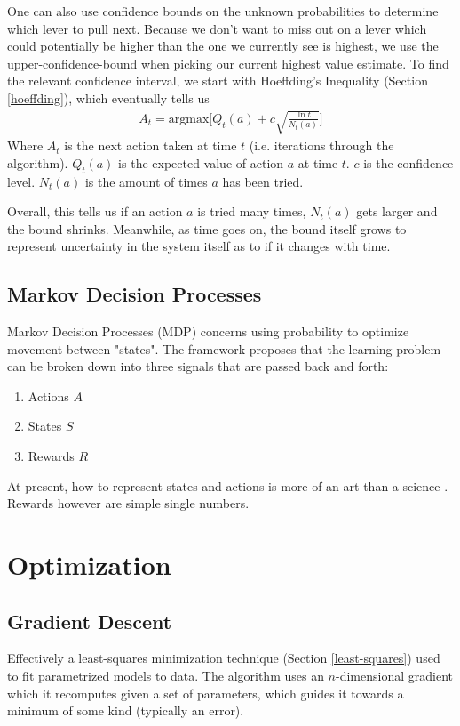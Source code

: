One can also use confidence bounds on the unknown probabilities to determine which lever to pull next. Because we don't want to miss out on a lever which could potentially be higher than the one we currently see is highest, we use the upper-confidence-bound when picking our current highest value estimate. To find the relevant confidence interval, we start with Hoeffding's Inequality (Section \ref{hoeffding}), which eventually tells us
\begin{align}
	A_t = \textrm{argmax}\Big[Q_t(a) + c\sqrt{\frac{\ln t}{N_t(a)}}\Big]
\end{align}
Where $A_t$ is the next action taken at time $t$ (i.e. iterations through the algorithm). $Q_t(a)$ is the expected value of action $a$ at time $t$. $c$ is the confidence level. $N_t(a)$ is the amount of times $a$ has been tried.

Overall, this tells us if an action $a$ is tried many times, $N_t(a)$ gets larger and the bound shrinks. Meanwhile, as time goes on, the bound itself grows to represent uncertainty in the system itself as to if it changes with time.


\subsection{Markov Decision Processes}
Markov Decision Processes (MDP) concerns using probability to optimize movement between "states". The framework proposes that the learning problem can be broken down into three signals that are passed back and forth: 
\begin{enumerate}
	\item Actions $A$
	\item States $S$
	\item Rewards $R$
\end{enumerate}
At present, how to represent states and actions is more of an art than a science \cite{sutton}. Rewards however are simple single numbers.



\section{Optimization}


\subsection{Gradient Descent}
Effectively a least-squares minimization technique (Section \ref{least-squares}) used to fit parametrized models to data. The algorithm uses an $n$-dimensional gradient which it recomputes given a set of parameters, which guides it towards a minimum of some kind (typically an error). 

